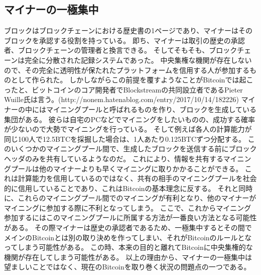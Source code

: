 \subsection{マイナーの一極集中}
ブロックはブロックチェーンにおける歴史書の1ページであり、マイナーはそのブロックを承認する役割を持っている。
即ち、マイナーは取引の歴史の承認者、ブロックチェーンの管理者と換言できる。
そしてそもそも、ブロックチェーンは完全に分散された記録システムであった。
中央集権な機関が存在しないので、その完全に透明性が保たれたプラットフォームを信用する人が参加するものとして作られた。
しかしながらこの前提を覆すようなことがBitcoinでは起こったと、ビットコインのコア開発者でBlockstreamの共同設立者であるPieter Wuille氏は言う。(http://nonem.hatenablog.com/entry/2017/10/14/182226)
マイナーの中にはマイニングプールと呼ばれるものを作り、ブロックを生成している集団がある。
彼らは自宅のPCなどでマイニングをしたいものの、成功する確率が少ないので大勢でマイニングを行っている。
そして例えば各人の計算能力が同じ100人で12.5BTCを採掘した場合は、1人あたり0.125BTCずつ分配する。
このいくつかのマイニングプール間で、生成したブロックを送信する前にブロックヘッダのみを共有しているようなのだ。
これにより、情報を共有するマイニングプールは他のマイナーよりも早くマイニングに取りかかることができる。
これは計算能力を信用しているのではなく、共有の相手のマイニングプールを社会的に信用していることであり、これはBitcoinの基本理念に反する。
それと同時に、これらのマイニングプール間でのマイニングが有利となり、他のマイナーがマイニングに参加する際に不利となってしまう。
ここで、これからマイニング参加するにはこのマイニングプールに所属する方法が一番良い方法となる可能性がある。
その際マイナーは歴史の承認者であるため、一極集中するとその間でメインのBitcoinとは別の取り決めを作ってしまい、それがBitcoinのルールとなってしまう可能性がある。
この時、本来の目的と離れてBitcoinに中央集権的な機関が存在してしまう可能性がある。
以上の理由から、マイナーの一極集中は望ましいことではなく、現在のBitcoinを取り巻く状況の問題点の一つである。

